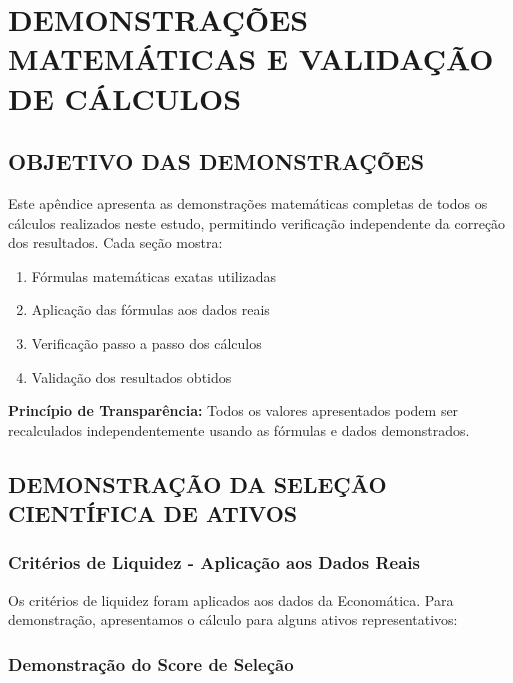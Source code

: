 
\appendix
\chapter{DEMONSTRAÇÕES MATEMÁTICAS E VALIDAÇÃO DE CÁLCULOS}

\section{OBJETIVO DAS DEMONSTRAÇÕES}

Este apêndice apresenta as demonstrações matemáticas completas de todos os cálculos realizados neste estudo, permitindo verificação independente da correção dos resultados. Cada seção mostra:

\begin{enumerate}
    \item Fórmulas matemáticas exatas utilizadas
    \item Aplicação das fórmulas aos dados reais
    \item Verificação passo a passo dos cálculos
    \item Validação dos resultados obtidos
\end{enumerate}

\textbf{Princípio de Transparência:} Todos os valores apresentados podem ser recalculados independentemente usando as fórmulas e dados demonstrados.

\section{DEMONSTRAÇÃO DA SELEÇÃO CIENTÍFICA DE ATIVOS}

\subsection{Critérios de Liquidez - Aplicação aos Dados Reais}

Os critérios de liquidez foram aplicados aos dados da Economática. Para demonstração, apresentamos o cálculo para alguns ativos representativos:

\subsection{Demonstração do Score de Seleção}

